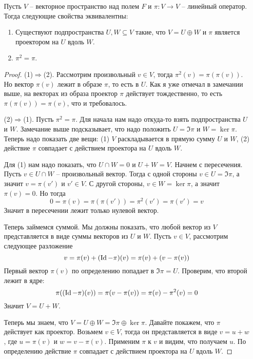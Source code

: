 \begin{claim}
\label{claim::Projector}
Пусть $V$ -- векторное пространство над полем $F$ и $\pi\colon V\to V$ -- линейный оператор.
Тогда следующие свойства эквивалентны:
\begin{enumerate}
\item Существуют подпространства $U,W\subseteq V$ такие, что $V = U\oplus W$ и $\pi$ является проектором на $U$ вдоль $W$.

\item $\pi^2 = \pi$.
\end{enumerate}
\end{claim}
\begin{proof}
(1)$\Rightarrow$(2).
Рассмотрим произвольный $v\in V$, тогда $\pi^2(v) = \pi(\pi(v))$.
Но вектор $\pi(v)$ лежит в образе $\pi$, то есть в $U$.
Как я уже отмечал в замечании выше, на векторах из образа проектор $\pi$ действует тождественно, то есть $\pi(\pi(v)) = \pi(v)$, что и требовалось.

(2)$\Rightarrow$(1).
Пусть $\pi^2 = \pi$.
Для начала нам  надо откуда-то взять подпространства $U$ и $W$.
Замечание выше подсказывает, что надо положить $U = \Im \pi$ и $W = \ker \pi$.
Теперь надо показать две вещи: (1) $V$ раскладывается в прямую сумму $U$ и $W$, (2) действие $\pi$ совпадает с действием проектора на $U$ вдоль $W$.

Для (1) нам надо показать, что $U\cap W = 0$ и $U + W = V$.
Начнем с пересечения.
Пусть $v\in U\cap W$ -- произвольный вектор.
Тогда с одной стороны $v\in U = \Im \pi$, а значит $v = \pi(v')$ и $v'\in V$.
С другой стороны, $v\in W = \ker \pi$, а значит $\pi(v) = 0$.
Но тогда
\[
0 = \pi(v) = \pi(\pi(v')) = \pi^2(v') = \pi(v') = v
\]
Значит в пересечении лежит только нулевой вектор.

Теперь займемся суммой.
Мы должны показать, что любой вектор из $V$ представляется в виде суммы векторов из $U$ и $W$.
Пусть $v\in V$, рассмотрим следующее разложение
\[
v = \pi (v) + (\operatorname{Id} - \pi) (v) = \pi(v) + (v - \pi(v))
\]
Первый вектор $\pi(v)$ по определению попадает в $\Im\pi = U$.
Проверим, что второй лежит в ядре:
\[
\pi((\operatorname{Id} - \pi)(v)) = \pi(v - \pi(v)) = \pi(v) - \pi^2(v) = 0
\]
Значит $V = U + W$.

Теперь мы знаем, что $V = U\oplus W = \Im \pi \oplus \ker \pi$.
Давайте покажем, что $\pi$ действует как проектор.
Возьмем $v\in V$, тогда он представляется в виде $v = u + w$, где $u = \pi(v)$ и $w = v - \pi(v)$.
Применим $\pi$ к $v$ и видим, что получаем $u$.
По определению действие $\pi$ совпадает с действием проектора на $U$ вдоль $W$.
\end{proof}

